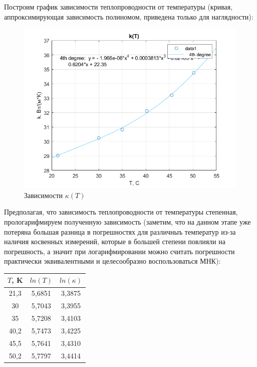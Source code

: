 \documentclass[a4paper, 12pt]{article} %
\begin{document}
Построим график зависимости теплопроводности от температуры (кривая, аппроксимирующая зависимость полиномом, приведена только для наглядности):

\begin{figure}[!h]
    \centering
    \includegraphics[width = 13 cm]{KT.png}
    \caption{Зависимости $\kappa (T)$}
    \label{fig:vac}
\end{figure}

Предполагая, что зависимость теплопроводности от температуры степенная, прологарифмируем полученную зависимость (заметим, что на данном этапе уже потеряна большая разница в погрешностях для различныъ температур из-за наличия косвенных измерений, которые в большей степени повлияли на погрешность, а значит при логарифмировании можно считать погрешности практически эквивалентными и целесообразно воспользоваться МНК):

\begin{center}
\begin{tabular}{|c|c|c|}
\hline
$T$, K & $ln(T)$ & $ln(\kappa)$ \\ \hline
21,3   & 5,6851  & 3,3875       \\ \hline
30     & 5,7043  & 3,3955       \\ \hline
35     & 5,7208  & 3,4103       \\ \hline
40,2   & 5,7473  & 3,4225       \\ \hline
45,5   & 5,7641  & 3,4310       \\ \hline
50,2   & 5,7797  & 3,4414      \\ \hline
\end{tabular}
\end{center}
\end{document}
